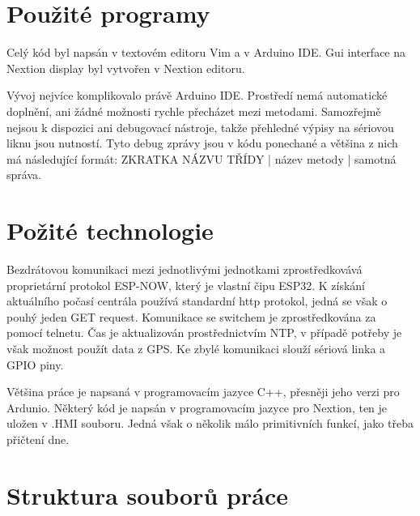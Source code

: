 \documentclass[a4paper,oneside,12pt]{report}
\begin{document}
\section{Použité programy}

Celý kód byl napsán v textovém editoru Vim a v Arduino IDE.
Gui interface na Nextion display byl vytvořen v Nextion editoru.

Vývoj nejvíce komplikovalo právě Arduino IDE.
Prostředí nemá automatické doplnění, ani žádné možnosti rychle přecházet mezi metodami.
Samozřejmě nejsou k dispozici ani debugovací nástroje, takže přehledné výpisy na sériovou liknu jsou nutností.
Tyto debug zprávy jsou v kódu ponechané a většina z nich má následující formát: ZKRATKA NÁZVU TŘÍDY | název metody | samotná správa.

\section{Požité technologie}

Bezdrátovou komunikaci mezi jednotlivými jednotkami zprostředkovává proprietární protokol ESP-NOW, který je vlastní čipu ESP32.
K získání aktuálního počasí centrála používá standardní http protokol, jedná se však o pouhý jeden GET request.
Komunikace se switchem je zprostředkována za pomocí telnetu.
Čas je aktualizován prostřednictvím NTP, v případě potřeby je však možnost použít data z GPS.
Ke zbylé komunikaci slouží sériová linka a GPIO piny.

Většina práce je napsaná v programovacím jazyce C++, přesněji jeho verzi pro Ardunio.
Některý kód je napsán v programovacím jazyce pro Nextion, ten je uložen v .HMI souboru.
Jedná však o několik málo primitivních funkcí, jako třeba přičtení dne.


\section{Struktura souborů práce}
\end{document}
